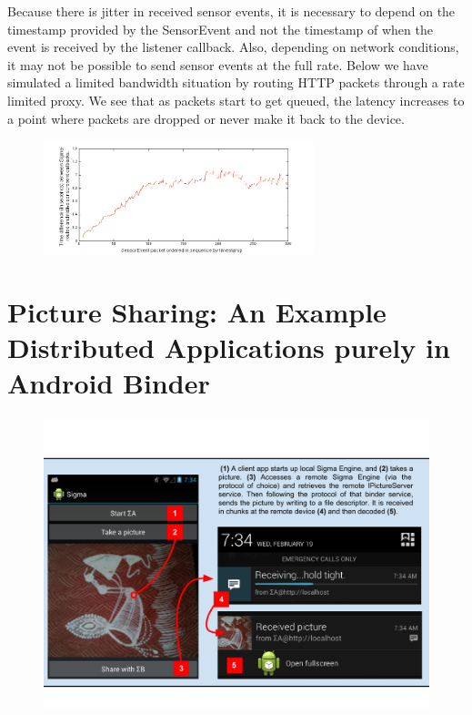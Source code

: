 \documentclass[prodmode]{acmlarge}
\begin{document}
Because there is jitter in received sensor events, it is necessary to depend on the timestamp provided by the SensorEvent and not the timestamp of when the event is received by the listener callback. Also, depending on network conditions, it may not be possible to send sensor events at the full rate. Below we have simulated a limited bandwidth situation by routing HTTP packets through a rate limited proxy. We see that as packets start to get queued, the latency increases to a point where packets are dropped or never make it back to the device.

\begin{figure}[h]
\centering
\includegraphics[width=0.7\textwidth]{plots/limited_bandwidth_increasing_latency.png}
\end{figure}

\section{Picture Sharing: An Example Distributed Applications purely in Android Binder}
\label{sec:ExampleApplication}

\begin{figure}[h]
\centering
\includegraphics[width=\textwidth]{drawings/PictureChatExample.pdf}
\end{figure}
\end{document}
